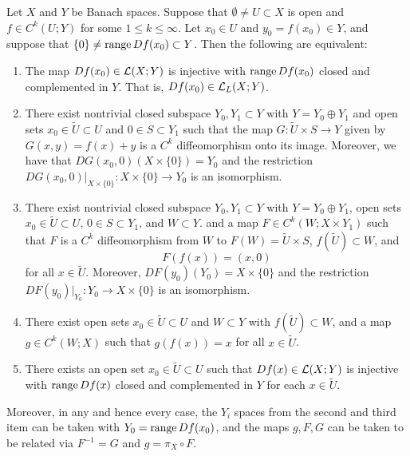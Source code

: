 \documentclass[a4paper]{article}
\begin{document}
\begin{thm}
Let $X$ and $Y$ be Banach spaces. Suppose that $\emptyset \neq U
\subset X$ is open and $f \in C^k(U; Y)$ for some $1 \leq k \leq
\infty$. Let $x_0 \in U$ and $y_0 = f(x_0) \in Y$, and suppose
that $\{0\} \neq \operatorname{range} Df(x_0) \subset Y$. Then the
following are equivalent:
\begin{enumerate}
\item The map $Df(x_0) \in \mathcal{L}(X; Y)$ is injective with $\operatorname{range}
Df(x_0)$ closed and complemented in $Y$. That is, $Df(x_0)
\in \mathcal{L}_L(X; Y)$.

\item There exist nontrivial closed subspace $Y_0, Y_1
\subset Y$ with $Y = Y_0 \oplus Y_1$ and open sets $x_0
\in \tilde{U} \subset U$ and $0 \in S \subset Y_1$ such that
the map $G : \tilde{U} \times S \to Y$ given by $G(x, y)
= f(x) + y$ is a $C^k$ diffeomorphism onto its image.
Moreover, we have that $DG(x_0, 0) (X \times \{0\}) = Y_0$
and the restriction $DG(x_0, 0) \vert_{X \times \{0\}}
: X \times \{0\} \to Y_0$ is an isomorphism.

\item There exist nontrivial closed subspace $Y_0, Y_1
\subset Y$ with $Y = Y_0 \oplus Y_1$, open sets $x_0 \in \tilde{U}
\subset U$, $0 \in S \subset Y_1$, and $W \subset Y$.
and a map $F \in C^k(W ; X \times Y_1)$ such that $F$
is a $C^k$ diffeomorphism from $W$ to $F(W) = \tilde{U}
\times S$, $f(\tilde{U}) \subset W$, and
\[
F(f(x)) = (x, 0)
\]
for all $x \in \tilde{U}$. Moreover, $DF(y_0) (Y_0) = X \times
\{0\}$ and the restriction $DF(y_0) \vert_{Y_0} : Y_0
\to X \times \{0\}$ is an isomorphism.

\item There exist open sets $x_0 \in \tilde{U} \subset U$
and $W \subset Y$ with $f(\tilde{U}) \subset W$, and a map
$g \in C^k(W ; X)$ such that $g(f(x)) = x$ for all $x \in
\tilde{U}$.

\item There exists an open set $x_0 \in \tilde{U} \subset U$
such that $Df(x) \in \mathcal{L}(X; Y)$ is injective with
$\operatorname{range} Df(x)$ closed and complemented in $Y$ for each
$x \in \tilde{U}$.
\end{enumerate}

Moreover, in any and hence every case, the $Y_i$ spaces
from the second and third item can be taken with $Y_0
= \operatorname{range} Df(x_0)$, and the maps $g, F, G$ can be taken to be related
via $F^{-1} = G$ and $g = \pi_X \circ F$.
\end{thm}
\end{document}
